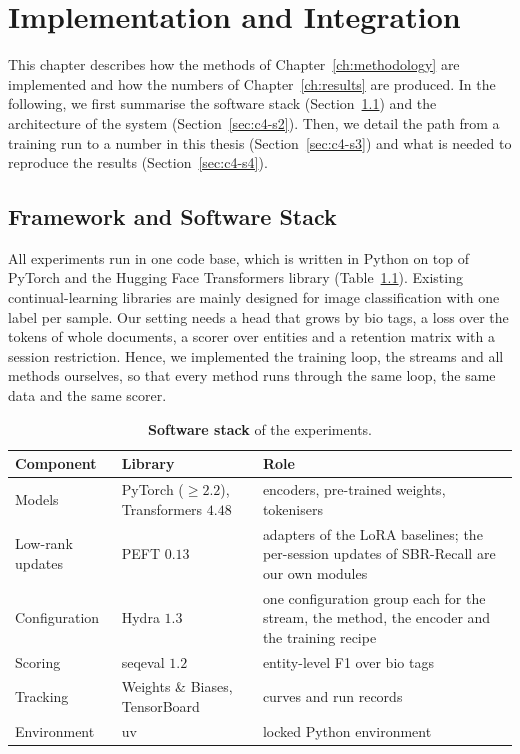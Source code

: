 \chapter{Implementation and Integration}
\label{ch:implementation}

This chapter describes how the methods of Chapter~\ref{ch:methodology} are implemented and
how the numbers of Chapter~\ref{ch:results} are produced. In the following, we first
summarise the software stack (Section~\ref{sec:c4-s1}) and the architecture of the system
(Section~\ref{sec:c4-s2}). Then, we detail the path from a training run to a number in
this thesis (Section~\ref{sec:c4-s3}) and what is needed to reproduce the results
(Section~\ref{sec:c4-s4}).

\section{Framework and Software Stack}
\label{sec:c4-s1}

All experiments run in one code base, which is written in Python on top of PyTorch and the
Hugging Face Transformers library (Table~\ref{tab:software-stack}). Existing
continual-learning libraries are mainly designed for image classification with one label
per sample. Our setting needs a head that grows by \gls{bio} tags, a loss over the tokens
of whole documents, a scorer over entities and a retention matrix with a session
restriction. Hence, we implemented the training loop, the streams and all methods
ourselves, so that every method runs through the same loop, the same data and the same
scorer.

\begin{table}[!htbp]
  \centering
  \caption[Software stack]{\textbf{Software stack} of the experiments.}
  \label{tab:software-stack}
  \small
  \begin{tabularx}{\textwidth}{@{}l l >{\raggedright\arraybackslash}X@{}}
    \toprule
    Component & Library & Role \\
    \midrule
    Models & PyTorch ($\geq 2.2$), Transformers $4.48$ & encoders, pre-trained weights,
      tokenisers \\
    Low-rank updates & PEFT $0.13$ & adapters of the LoRA baselines; the per-session
      updates of SBR-Recall are our own modules \\
    Configuration & Hydra $1.3$ & one configuration group each for the stream, the method,
      the encoder and the training recipe \\
    Scoring & seqeval $1.2$ & entity-level F1 over \gls{bio} tags \\
    Tracking & Weights \& Biases, TensorBoard & curves and run records \\
    Environment & uv & locked Python environment \\
    \bottomrule
  \end{tabularx}
\end{table}

